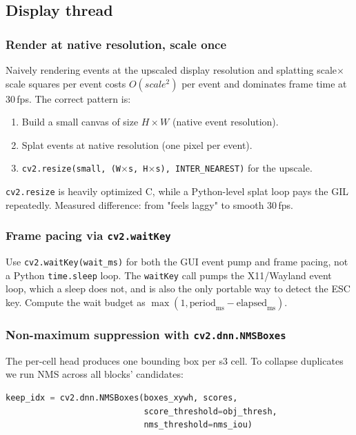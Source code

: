 \documentclass[11pt,a4paper]{article}
\begin{document}
\subsection{Display thread}

\subsubsection*{Render at native resolution, scale once}

Naively rendering events at the upscaled display resolution and
splatting scale$\times$scale squares per event costs $O(scale^2)$ per
event and dominates frame time at 30\,fps. The correct pattern is:

\begin{enumerate}[itemsep=0pt]
  \item Build a small canvas of size $H\times W$ (native event resolution).
  \item Splat events at native resolution (one pixel per event).
  \item \texttt{cv2.resize(small, (W$\times$s, H$\times$s),
        INTER\_NEAREST)} for the upscale.
\end{enumerate}

\texttt{cv2.resize} is heavily optimized C, while a Python-level splat
loop pays the GIL repeatedly. Measured difference: from "feels laggy"
to smooth 30\,fps.

\subsubsection*{Frame pacing via \texttt{cv2.waitKey}}

Use \texttt{cv2.waitKey(wait\_ms)} for both the GUI event pump and
frame pacing, not a Python \texttt{time.sleep} loop. The \texttt{waitKey}
call pumps the X11/Wayland event loop, which a sleep does not, and is
also the only portable way to detect the ESC key. Compute the wait
budget as $\max(1, \text{period}_{\text{ms}} - \text{elapsed}_{\text{ms}})$.

\subsubsection*{Non-maximum suppression with \texttt{cv2.dnn.NMSBoxes}}

The per-cell head produces one bounding box per s3 cell. To collapse
duplicates we run NMS across all blocks' candidates:

\begin{lstlisting}[language=Python]
keep_idx = cv2.dnn.NMSBoxes(boxes_xywh, scores,
                            score_threshold=obj_thresh,
                            nms_threshold=nms_iou)
\end{lstlisting}
\end{document}
